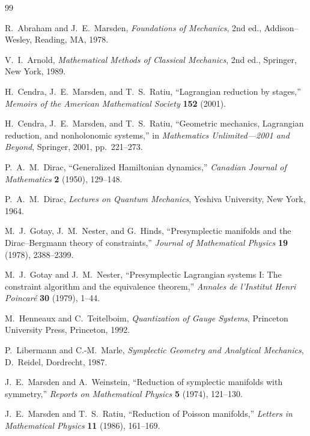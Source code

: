 \documentclass[11pt,a4paper]{article}
\theoremstyle{definition}
\begin{document}
\begin{thebibliography}{99}

R.~Abraham and J.~E.~Marsden,
\emph{Foundations of Mechanics},
2nd ed., Addison--Wesley, Reading, MA, 1978.

V.~I.~Arnold,
\emph{Mathematical Methods of Classical Mechanics},
2nd ed., Springer, New York, 1989.

H.~Cendra, J.~E.~Marsden, and T.~S.~Ratiu,
``Lagrangian reduction by stages,''
\emph{Memoirs of the American Mathematical Society} \textbf{152} (2001).

H.~Cendra, J.~E.~Marsden, and T.~S.~Ratiu,
``Geometric mechanics, Lagrangian reduction, and nonholonomic systems,''
in \emph{Mathematics Unlimited---2001 and Beyond},
Springer, 2001, pp.~221--273.

P.~A.~M.~Dirac,
``Generalized Hamiltonian dynamics,''
\emph{Canadian Journal of Mathematics} \textbf{2} (1950), 129--148.

P.~A.~M.~Dirac,
\emph{Lectures on Quantum Mechanics},
Yeshiva University, New York, 1964.

M.~J.~Gotay, J.~M.~Nester, and G.~Hinds,
``Presymplectic manifolds and the Dirac--Bergmann theory of constraints,''
\emph{Journal of Mathematical Physics} \textbf{19} (1978), 2388--2399.

M.~J.~Gotay and J.~M.~Nester,
``Presymplectic Lagrangian systems I: The constraint algorithm and the
equivalence theorem,''
\emph{Annales de l'Institut Henri Poincaré} \textbf{30} (1979), 1--44.

M.~Henneaux and C.~Teitelboim,
\emph{Quantization of Gauge Systems},
Princeton University Press, Princeton, 1992.

P.~Libermann and C.-M.~Marle,
\emph{Symplectic Geometry and Analytical Mechanics},
D.~Reidel, Dordrecht, 1987.

J.~E.~Marsden and A.~Weinstein,
``Reduction of symplectic manifolds with symmetry,''
\emph{Reports on Mathematical Physics} \textbf{5} (1974), 121--130.

J.~E.~Marsden and T.~S.~Ratiu,
``Reduction of Poisson manifolds,''
\emph{Letters in Mathematical Physics} \textbf{11} (1986), 161--169.


\end{thebibliography}
\end{document}
